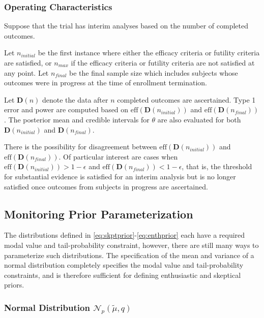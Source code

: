 \documentclass[12pt]{article}
\begin{document}
\subsubsection{Operating Characteristics}
Suppose that the trial has interim analyses based on the number of completed outcomes.

Let $n_{initial}$ be the first instance where either the efficacy criteria or futility criteria are satisfied, or $n_{max}$ if the efficacy criteria or futility criteria are not satisfied at any point. Let $n_{final}$ be the final sample size which includes subjects whose outcomes were in progress at the time of enrollment termination. 

Let $\mathbf{D}(n)$ denote the data after $n$ completed outcomes are ascertained. Type 1 error and power are computed based on $\text{eff}(\mathbf{D}(n_{initial}))$ and $\text{eff}(\mathbf{D}(n_{final}))$. The posterior mean and credible intervals for $\theta$ are also evaluated for both $\mathbf{D}(n_{initial})$ and $\mathbf{D}(n_{final})$.

There is the possibility for disagreement between $\text{eff}(\mathbf{D}(n_{initial}))$ and $\text{eff}(\mathbf{D}(n_{final}))$. Of particular interest are cases when $\text{eff}(\mathbf{D}(n_{initial}))>1-\epsilon$ and $\text{eff}(\mathbf{D}(n_{final}))<1-\epsilon$, that is, the threshold for substantial evidence is satisfied for an interim analysis but is no longer satisfied once outcomes from subjects in progress are ascertained.


\subsection{Monitoring Prior Parameterization}


The distributions defined in \eqref{eq:skptprior}-\eqref{eq:enthprior} each have a required 
modal value and tail-probability constraint, however, there are still many ways to parameterize such distributions. 
%
The specification of the mean and variance of a normal distribution completely specifies the modal value and tail-probability constraints, and is therefore sufficient for defining enthusiastic and skeptical priors.

\subsubsection{Normal Distribution $\mathcal{N}_p(\tilde{\mu},q)$}
\end{document}
